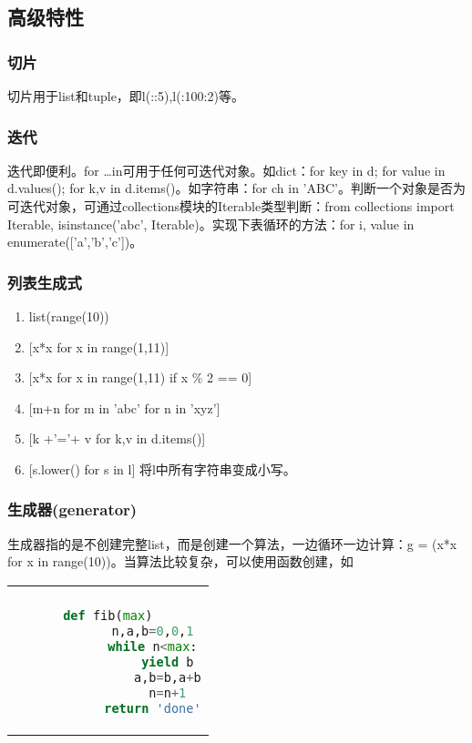 \documentclass[12pt,a4paper]{article}
\begin{document}
\begin{CJK}{UTF8}{gbsn}
    \subsection{高级特性}
    \subsubsection{切片}
    切片用于list和tuple，即l(::5),l(:100:2)等。
    \subsubsection{迭代}
    迭代即便利。for \ldots in可用于任何可迭代对象。如dict：for key in d; for value in d.values(); for k,v in d.items()。如字符串：for ch in 'ABC'。判断一个对象是否为可迭代对象，可通过collections模块的Iterable类型判断：from collections import Iterable, isinstance('abc', Iterable)。实现下表循环的方法：for i, value in enumerate(['a','b','c'])。
    \subsubsection{列表生成式}
    \begin{enumerate}
        \item{} list(range(10))
        \item{} [x*x for x in range(1,11)]
        \item{} [x*x for x in range(1,11) if x \% 2 == 0]
        \item{} [m+n for m in 'abc' for n in 'xyz']
        \item{} [k +'='+ v for k,v in d.items()]
        \item{} [s.lower() for s in l] 将l中所有字符串变成小写。
    \end{enumerate}
    \subsubsection{生成器(generator)}
    生成器指的是不创建完整list，而是创建一个算法，一边循环一边计算：g = (x*x for x in range(10))。当算法比较复杂，可以使用函数创建，如\\
    \begin{tabular}{|c|}
        \hline\\
        \begin{lstlisting}[language=python]
        def fib(max)
            n,a,b=0,0,1
            while n<max:
                yield b
                a,b=b,a+b
                n=n+1
            return 'done'
        \end{lstlisting}\\
        \hline
    \end{tabular}


\end{CJK}
\end{document}
